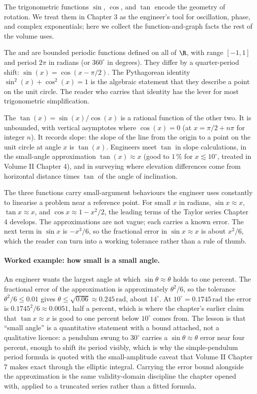 The trigonometric functions $\sin$, $\cos$, and $\tan$ encode the
geometry of rotation. We treat them in Chapter 3 as the engineer's
tool for oscillation, phase, and complex exponentials; here we
collect the function-and-graph facts the rest of the volume uses.

The  and  are bounded periodic
functions defined on all of $\R$, with range $[-1, 1]$ and period
$2\pi$ in radians (or $360^{\circ}$ in degrees). They differ by a
quarter-period shift: $\sin(x) = \cos(x - \pi/2)$. The Pythagorean
identity $\sin^{2}(x) + \cos^{2}(x) = 1$ is the algebraic statement
that they describe a point on the unit circle. The reader who carries
that identity has the lever for most trigonometric simplification.

The  $\tan(x) = \sin(x)/\cos(x)$ is a rational
function of the other two. It is unbounded, with vertical asymptotes
where $\cos(x) = 0$ (at $x = \pi/2 + n\pi$ for integer $n$). It
records slope: the slope of the line from the origin to a point on
the unit circle at angle $x$ is $\tan(x)$. Engineers meet $\tan$ in
slope calculations, in the small-angle approximation $\tan(x) \approx
x$ (good to $1\,\%$ for $x \lesssim 10^{\circ}$, treated in Volume II
Chapter 4), and in surveying where elevation differences come from
horizontal distance times $\tan$ of the angle of inclination.

The three functions carry small-argument behaviours the engineer uses
constantly to linearise a problem near a reference point. For small
$x$ in radians, $\sin x \approx x$, $\tan x \approx x$, and
$\cos x \approx 1 - x^2/2$, the leading terms of the Taylor series
Chapter 4 develops. The approximations are not vague; each carries a
known error. The next term in $\sin x$ is $-x^3/6$, so the fractional
error in $\sin x \approx x$ is about $x^2/6$, which the reader can turn
into a working tolerance rather than a rule of thumb.

\paragraph{Worked example: how small is a small angle.}
An engineer wants the largest angle at which $\sin\theta \approx
\theta$ holds to one percent. The fractional error of the
approximation is approximately $\theta^2/6$, so the tolerance
$\theta^2/6 \leq 0.01$ gives $\theta \leq \sqrt{0.06} \approx
0.245\,\si{\radian}$, about $14^{\circ}$. At $10^{\circ} =
0.1745\,\si{\radian}$ the error is $0.1745^2/6 \approx 0.0051$, half a
percent, which is where the chapter's earlier claim that
$\tan x \approx x$ is good to one percent below $10^{\circ}$ comes from.
The lesson is that ``small angle'' is a quantitative statement with a
bound attached, not a qualitative licence: a pendulum swung to
$30^{\circ}$ carries a $\sin\theta \approx \theta$ error near four
percent, enough to shift its period visibly, which is why the
simple-pendulum period formula is quoted with the small-amplitude
caveat that Volume II Chapter 7 makes exact through the elliptic
integral. Carrying the error bound alongside the approximation is the
same validity-domain discipline the chapter opened with, applied to a
truncated series rather than a fitted formula.

